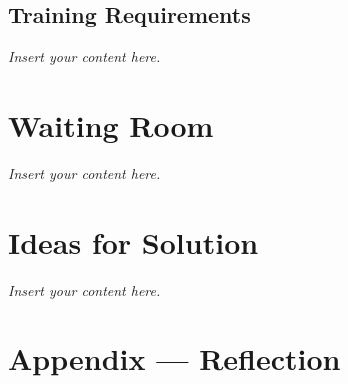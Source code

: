 \documentclass[12pt]{article}
\newcommand{\lips}{\textit{Insert your content here.}}
\begin{document}
\subsection{Training Requirements}
\lips

\section{Waiting Room}
\lips

\section{Ideas for Solution}
\lips

\newpage{}
\section*{Appendix --- Reflection}




\end{document}
